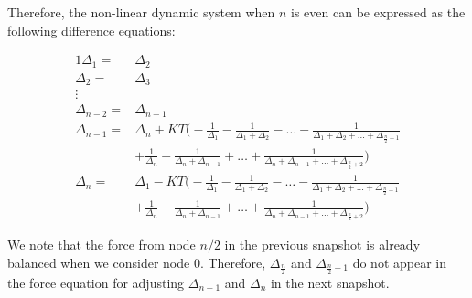 Therefore, the non-linear dynamic system when $n$ is even can be expressed as the following difference equations:

\begin{alignat}{1}
 \Delta_{1} =& \Delta_{2} \nonumber \\
 \Delta_{2} =& \Delta_{3} \nonumber \\
 \vdots \nonumber \\
 \Delta_{n-2} =& \Delta_{n-1} \nonumber \\
 \Delta_{n-1} =& \Delta_{n} + KT\Bigg( -\frac{1}{\Delta_{1}} - \frac{1}{\Delta_{1} + \Delta_{2}} - \hdots - \frac{1}{\Delta_{1} + \Delta_{2} + \hdots + \Delta_{\frac{n}{2}-1}} \nonumber \\ 
&+ \frac{1}{\Delta_{n}} + \frac{1}{\Delta_{n} + \Delta_{n-1}} + \hdots + \frac{1}{\Delta_{n} + \Delta_{n-1} + \hdots + \Delta_{\frac{n}{2}+2}}\Bigg) \nonumber \\
 \Delta_{n} =& \Delta_{1} - KT\Bigg( -\frac{1}{\Delta_{1}} - \frac{1}{\Delta_{1} + \Delta_{2}} - \hdots - \frac{1}{\Delta_{1} + \Delta_{2} + \hdots + \Delta_{\frac{n}{2}-1}} \nonumber \\ 
&+ \frac{1}{\Delta_{n}} + \frac{1}{\Delta_{n} + \Delta_{n-1}} + \hdots + \frac{1}{\Delta_{n} + \Delta_{n-1} + \hdots + \Delta_{\frac{n}{2}+2}}\Bigg) 
\end{alignat}

We note that the force from node $n/2$ in the previous snapshot is already balanced when we consider node 0. Therefore, $\Delta_{\frac{n}{2}}$ and $\Delta_{\frac{n}{2}+1}$ do not appear in the force equation for adjusting $\Delta_{n-1}$ and $\Delta_{n}$ in the next snapshot.

